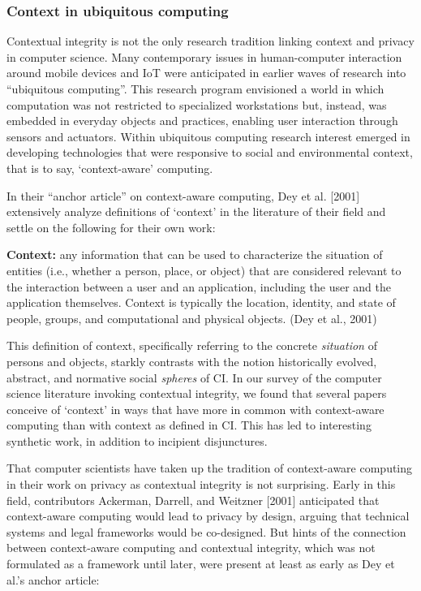 \documentclass[../thesis.tex]{subfiles}
\begin{document}
\subsubsection{Context in ubiquitous computing}
\label{CI2.2.1}

Contextual integrity is not the only research tradition linking context
and privacy in computer science. Many contemporary issues in
human-computer interaction around mobile devices and IoT were
anticipated in earlier waves of research into
``ubiquitous computing''. This
research program envisioned a world in which computation was not
restricted to specialized workstations but, instead, was embedded in
everyday objects and practices, enabling user interaction through
sensors and actuators. Within ubiquitous computing research interest
emerged in developing technologies that were responsive to social and
environmental context, that is to say,
`context-aware' computing.

In their ``anchor article'' on
context-aware computing, Dey et al. [2001] extensively analyze
definitions of `context' in the
literature of their field and settle on the following for their own
work:


\bigskip

\textbf{Context:}
any information that can be used to characterize the situation of
entities (i.e., whether a person, place, or object) that are considered
relevant to the interaction between a user and an application,
including the user and the application themselves. Context is typically
the location, identity, and state of people, groups, and computational
and physical objects. (Dey et al., 2001)


\bigskip

This definition of context, specifically referring to the concrete
\textit{situation} of persons and objects, starkly contrasts with the
notion historically evolved, abstract, and normative social
\textit{spheres} of CI. In our survey of the computer science
literature invoking contextual integrity, we found that several papers
conceive of `context' in ways that have
more in common with context-aware computing than with context as
defined in CI. This has led to interesting synthetic work, in addition
to incipient disjunctures. 


\bigskip

That computer scientists have taken up the tradition of context-aware
computing in their work on privacy as contextual integrity is not
surprising. Early in this field, contributors
Ackerman, Darrell,
and Weitzner [2001] anticipated that
context-aware
computing would lead to privacy by design, arguing that technical
systems and legal frameworks would be co-designed. But hints of the
connection between context-aware computing and contextual integrity,
which was not formulated as a framework until later, were present at
least as early as Dey et al.'s anchor article:
\end{document}
